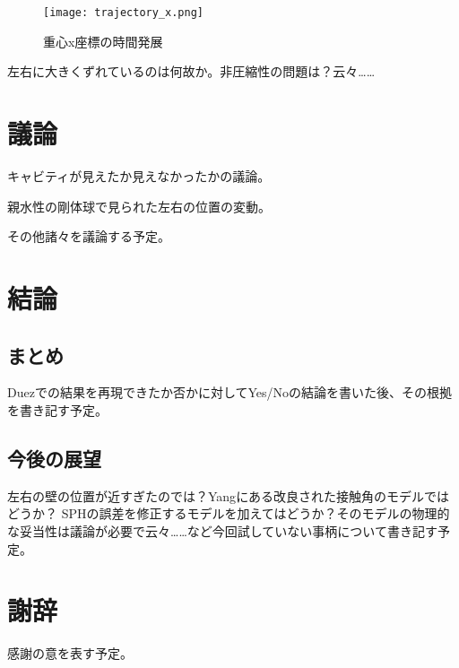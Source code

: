 \documentclass[]{jsarticle}
\begin{document}
\begin{figure}[H]
  \centering
  \texttt{[image: trajectory\_x.png]}
  \caption{重心x座標の時間発展}
  \label{fig:trajectory}
\end{figure}

左右に大きくずれているのは何故か。非圧縮性の問題は？云々……
\newpage

\section{議論}

キャビティが見えたか見えなかったかの議論。

親水性の剛体球で見られた左右の位置の変動。

その他諸々を議論する予定。
\newpage
\section{結論}
\subsection{まとめ}
Duez\cite{Duez2007}での結果を再現できたか否かに対してYes/Noの結論を書いた後、その根拠を書き記す予定。
\subsection{今後の展望}
左右の壁の位置が近すぎたのでは？Yang\cite{Yang2017}にある改良された接触角のモデルではどうか？
SPHの誤差を修正するモデルを加えてはどうか？そのモデルの物理的な妥当性は議論が必要で云々……など今回試していない事柄について書き記す予定。
\newpage

\section{謝辞}
感謝の意を表す予定。
\newpage



\end{document}

